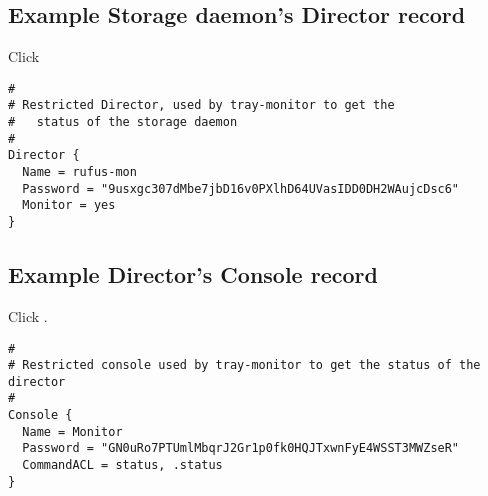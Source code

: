 \subsection{Example Storage daemon's Director record}

Click

\footnotesize
\begin{verbatim}
#
# Restricted Director, used by tray-monitor to get the
#   status of the storage daemon
#
Director {
  Name = rufus-mon
  Password = "9usxgc307dMbe7jbD16v0PXlhD64UVasIDD0DH2WAujcDsc6"
  Monitor = yes
}
\end{verbatim}
\normalsize

\subsection{Example Director's Console record}

Click
.

\footnotesize
\begin{verbatim}
#
# Restricted console used by tray-monitor to get the status of the director
#
Console {
  Name = Monitor
  Password = "GN0uRo7PTUmlMbqrJ2Gr1p0fk0HQJTxwnFyE4WSST3MWZseR"
  CommandACL = status, .status
}
\end{verbatim}
\normalsize
